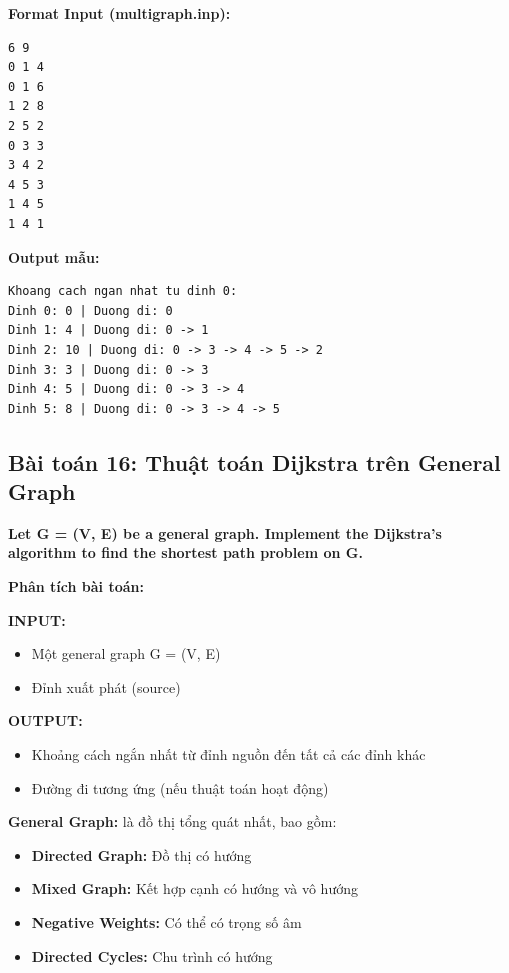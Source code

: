 \documentclass[12pt,a4paper]{article}
\begin{document}
\textbf{Format Input (multigraph.inp):}

\begin{verbatim}
6 9
0 1 4
0 1 6
1 2 8
2 5 2
0 3 3
3 4 2
4 5 3
1 4 5
1 4 1
\end{verbatim}

\textbf{Output mẫu:}
\begin{verbatim}
Khoang cach ngan nhat tu dinh 0:
Dinh 0: 0 | Duong di: 0
Dinh 1: 4 | Duong di: 0 -> 1
Dinh 2: 10 | Duong di: 0 -> 3 -> 4 -> 5 -> 2
Dinh 3: 3 | Duong di: 0 -> 3
Dinh 4: 5 | Duong di: 0 -> 3 -> 4
Dinh 5: 8 | Duong di: 0 -> 3 -> 4 -> 5
\end{verbatim}

\newpage

\subsection{Bài toán 16: Thuật toán Dijkstra trên General Graph}

\begin{problembox}
    \textbf{Let G = (V, E) be a general graph. Implement the Dijkstra's algorithm to find the shortest path problem on G.}
\end{problembox}

\textbf{Phân tích bài toán:}

\textbf{INPUT:}
\begin{itemize}[label=\textbullet]
    \item Một general graph G = (V, E)
    \item Đỉnh xuất phát (source)
\end{itemize}

\textbf{OUTPUT:}
\begin{itemize}[label=\textbullet]
    \item Khoảng cách ngắn nhất từ đỉnh nguồn đến tất cả các đỉnh khác
    \item Đường đi tương ứng (nếu thuật toán hoạt động)
\end{itemize}

\textbf{General Graph:} là đồ thị tổng quát nhất, bao gồm:
\begin{itemize}[label=\textbullet]
    \item \textbf{Directed Graph:} Đồ thị có hướng
    \item \textbf{Mixed Graph:} Kết hợp cạnh có hướng và vô hướng
    \item \textbf{Negative Weights:} Có thể có trọng số âm
    \item \textbf{Directed Cycles:} Chu trình có hướng
\end{itemize}
\end{document}
